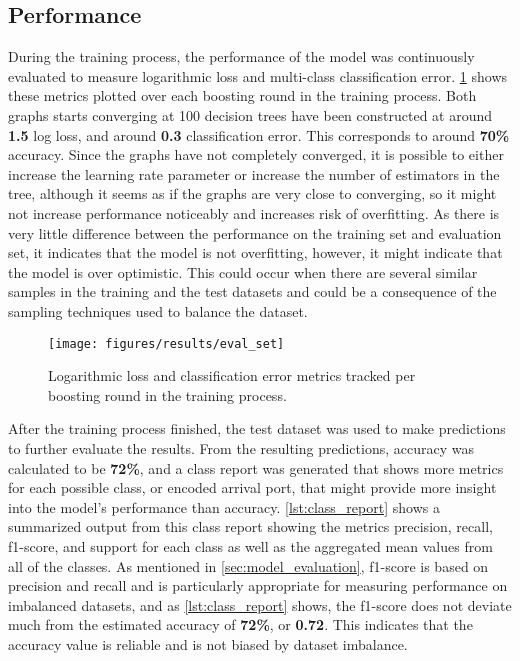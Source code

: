 \subsection{Performance}

During the training process, the performance of the model was continuously evaluated to measure logarithmic loss and multi-class classification error. \cref{fig:eval_set} shows these metrics plotted over each boosting round in the training process. Both graphs starts converging at 100 decision trees have been constructed at around \textbf{1.5} log loss, and around \textbf{0.3} classification error. This corresponds to around \textbf{70\%} accuracy. Since the graphs have not completely converged, it is possible to either increase the learning rate parameter or increase the number of estimators in the tree, although it seems as if the graphs are very close to converging, so it might not increase performance noticeably and increases risk of overfitting. As there is very little difference between the performance on the training set and evaluation set, it indicates that the model is not overfitting, however, it might indicate that the model is over optimistic. This could occur when there are several similar samples in the training and the test datasets and could be a consequence of the sampling techniques used to balance the dataset.

\begin{figure}[htbp]
    \centering
    \texttt{[image: figures/results/eval\_set]}
    \caption{Logarithmic loss and classification error metrics tracked per boosting round in the training process.}
    \label{fig:eval_set}
\end{figure}

After the training process finished, the test dataset was used to make predictions to further evaluate the results. From the resulting predictions, accuracy was calculated to be \textbf{72\%}, and a class report was generated that shows more metrics for each possible class, or encoded arrival port, that might provide more insight into the model's performance than accuracy. \cref{lst:class_report} shows a summarized output from this class report showing the metrics precision, recall, f1-score, and support for each class as well as the aggregated mean values from all of the classes. As mentioned in \cref{sec:model_evaluation}, f1-score is based on precision and recall and is particularly appropriate for measuring performance on imbalanced datasets, and as \cref{lst:class_report} shows, the f1-score does not deviate much from the estimated accuracy of \textbf{72\%}, or \textbf{0.72}. This indicates that the accuracy value is reliable and is not biased by dataset imbalance.

